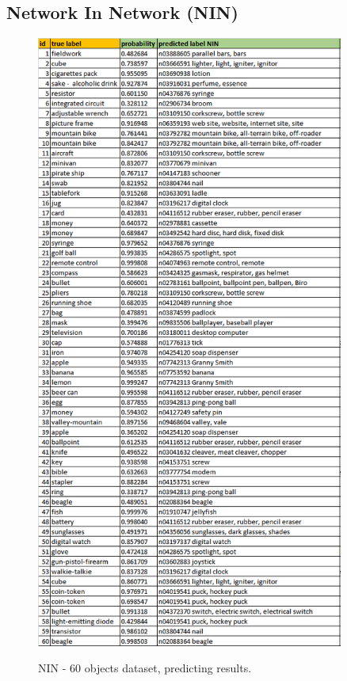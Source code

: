 \documentclass[12pt]{article}
\numberwithin{equation}{section}
\numberwithin{table}{section}
\numberwithin{figure}{section}
\begin{document}
\subsection{Network In Network (NIN)}
\begin{figure}[H] \centering
	\caption{NIN - 60 objects dataset, predicting results.}
	\includegraphics[width=0.9\textwidth]{nin.png}
	\label{r4}
\end{figure}

\end{document}
